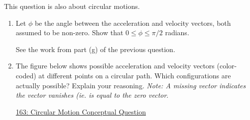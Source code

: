 \documentclass{ximera}
\begin{document}
\begin{question}  \label{Q32frr3r4r4}
This question is also about circular motions.
\begin{enumerate}

\item Let $\phi$ be the angle between the acceleration and velocity vectors, both assumed to be non-zero. Show that $0\leq \phi \leq \pi/2$ radians.

\begin{hint}
See the work from part (g) of the previous question.
\end{hint}

\item The figure below shows possible acceleration and velocity vectors (color-coded) at different points on a circular path. Which configurations are actually possible? Explain your reasoning. \emph{Note: A missing vector indicates the vector vanishes (ie. is equal to the zero vector}.

\begin{freeResponse}
\end{freeResponse}

\begin{onlineOnly}
    \begin{center}
\end{center}
\end{onlineOnly}

\href{https://www.geogebra.org/classic/yzcwddhb}{163: Circular Motion Conceptual Question}

\end{enumerate}

\end{question}
\end{document}
